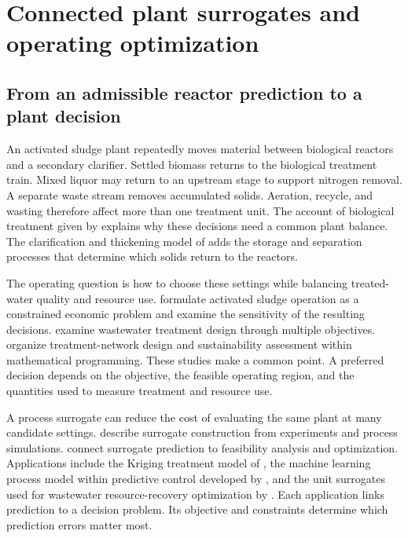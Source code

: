 \chapter{Connected plant surrogates and operating optimization}
\label{ch:plant}

\section{From an admissible reactor prediction to a plant decision}

An activated sludge plant repeatedly moves material between biological reactors and a secondary clarifier. Settled biomass returns to the biological treatment train. Mixed liquor may return to an upstream stage to support nitrogen removal. A separate waste stream removes accumulated solids. Aeration, recycle, and wasting therefore affect more than one treatment unit. The account of biological treatment given by \citet{Henze2008} explains why these decisions need a common plant balance. The clarification and thickening model of \citet{HartelPopel1992} adds the storage and separation processes that determine which solids return to the reactors.

The operating question is how to choose these settings while balancing treated-water quality and resource use. \citet{Araujo2013} formulate activated sludge operation as a constrained economic problem and examine the sensitivity of the resulting decisions. \citet{PadronPaez2020} examine wastewater treatment design through multiple objectives. \citet{Aboagye2021} organize treatment-network design and sustainability assessment within mathematical programming. These studies make a common point. A preferred decision depends on the objective, the feasible operating region, and the quantities used to measure treatment and resource use.

A process surrogate can reduce the cost of evaluating the same plant at many candidate settings. \citet{McBride2019} describe surrogate construction from experiments and process simulations. \citet{BhosekarIerapetritou2018} connect surrogate prediction to feasibility analysis and optimization. Applications include the Kriging treatment model of \citet{He2023}, the machine learning process model within predictive control developed by \citet{Bernardelli2020}, and the unit surrogates used for wastewater resource-recovery optimization by \citet{Durkin2024}. Each application links prediction to a decision problem. Its objective and constraints determine which prediction errors matter most.

